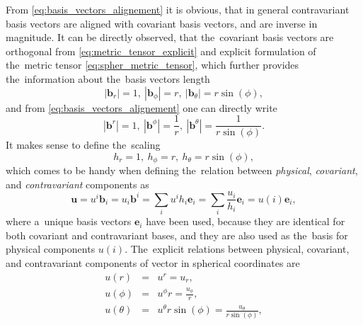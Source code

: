 \documentclass[preprint,12pt]{elsarticle}
\newcommand{\vect}[1]{\boldsymbol{#1}}
\begin{document}
From \eqref{eq:basis_vectors_alignement} it is obvious, 
that in general contravariant basis vectors are aligned with covariant basis 
vectors, and are inverse in magnitude.
It can be directly observed, that the~covariant basis vectors are orthogonal
from \eqref{eq:metric_tensor_explicit} and explicit formulation of 
the~metric tensor \eqref{eq:spher_metric_tensor}, which further provides
the~information about the~basis vectors length
\begin{equation}
  |\vect{b}_r| = 1,~ |\vect{b}_\phi| = r,~ |\vect{b}_\theta| = r\sin(\phi), 
  \nonumber
\end{equation} 
and from \eqref{eq:basis_vectors_alignement} one can directly write
\begin{equation}
  |\vect{b}^r| = 1,~ |\vect{b}^\phi| = \frac{1}{r},~ 
  |\vect{b}^\theta| = \frac{1}{r\sin(\phi)}.
  \nonumber
\end{equation}
It makes sense to define the~scaling
\begin{equation}
  h_r = 1,~ h_\phi = r,~ h_\theta = r\sin(\phi), 
  \label{eq:spher_scaling}
\end{equation} 
which comes to be handy when defining the~relation between 
\textit{physical}, \textit{covariant}, and \textit{contravariant} components as
\begin{equation}
  \vect{u} = u^i \vect{b}_i = u_i \vect{b}^i = \sum_i u^i h_i \vect{e}_i
  = \sum_i \frac{u_i}{h_i} \vect{e}_i = u(i) \vect{e}_i,
  \label{eq:spher_components}
\end{equation}
where a~unique basis vectors $\vect{e}_i$ have been used, because they are 
identical for both covariant and contravariant bases, and they are also used
as the~basis for physical components $u(i)$.
The~explicit relations between physical, covariant, and contravariant components
of vector in spherical coordinates are
\begin{eqnarray}
  u(r) &=& u^r = u_r , \nonumber\\ 
  u(\phi) &=& u^\phi r = \frac{u_\phi}{r} , \nonumber\\
   u(\theta) &=& u^\theta r\sin(\phi) = \frac{u_\theta}{r\sin(\phi)} ,
  \label{eq:spher_physical_components}
\end{eqnarray}
\end{document}
